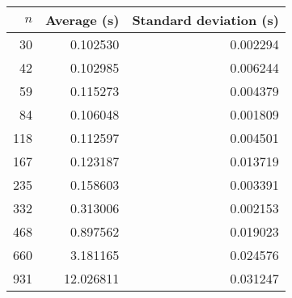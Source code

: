 \begin{tabular}{rrr}
$n$ & Average (s) & Standard deviation (s)\\\hline
30 & 0.102530 & 0.002294\\
42 & 0.102985 & 0.006244\\
59 & 0.115273 & 0.004379\\
84 & 0.106048 & 0.001809\\
118 & 0.112597 & 0.004501\\
167 & 0.123187 & 0.013719\\
235 & 0.158603 & 0.003391\\
332 & 0.313006 & 0.002153\\
468 & 0.897562 & 0.019023\\
660 & 3.181165 & 0.024576\\
931 & 12.026811 & 0.031247\\
\end{tabular}
